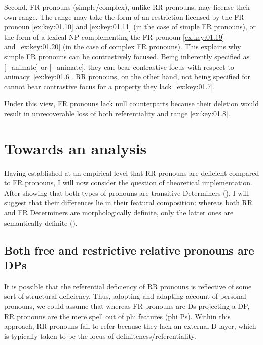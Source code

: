 \documentclass[output=paper]{langsci/langscibook}
\begin{document}
Second, \gls{FR} pronouns
(simple/complex), unlike \gls{RR} pronouns, may license their own range. The
range may take the form of an  restriction licensed by the
\gls{FR} pronoun \eqref{ex:key:01.10} and \eqref{ex:key:01.11} (in the case of
simple \gls{FR} pronouns), or the form of a lexical NP complementing the
\gls{FR} pronoun \eqref{ex:key:01.19} and~\eqref{ex:key:01.20} (in the case of
complex \gls{FR} pronouns). This explains why simple \gls{FR} pronouns can be
contrastively focused. Being inherently specified as [+animate] or
[−animate], they can bear contrastive focus with respect to animacy~\eqref{ex:key:01.6}.  \gls{RR} pronouns, on
    the other hand, not being specified for  cannot bear
    contrastive focus for a property they
    lack~\eqref{ex:key:01.7}.

Under this view, \gls{FR} pronouns lack null counterparts because their
deletion would result in unrecoverable loss of both referentiality and range
\eqref{ex:key:01.8}.

\section{Towards an analysis}\label{sec:key:01.4}

Having established at an empirical level that \gls{RR} pronouns are deficient compared to \gls{FR}
pronouns, I will now consider the question of theoretical implementation.
After showing that both types of pronouns are transitive Determiners
(), I will suggest that their differences
lie in their featural composition: whereas both \gls{RR} and \gls{FR}
Determiners are morphologically definite, only the latter ones are semantically
definite ().

\subsection{Both free and restrictive relative pronouns are
DPs}\label{sub:key:01.4.1}

It is possible that the referential deficiency of \gls{RR} pronouns is reflective of some sort of
structural deficiency. Thus, adopting and adapting  account
of personal pronouns, we could assume that whereas \gls{FR} pronouns are Ds
projecting a DP, \gls{RR} pronouns are the mere spell out of phi features (phi Ps).
Within this approach, \gls{RR} pronouns fail to refer because they lack an external D layer, which
is typically taken to be the locus of definiteness/referentiality.
\end{document}
